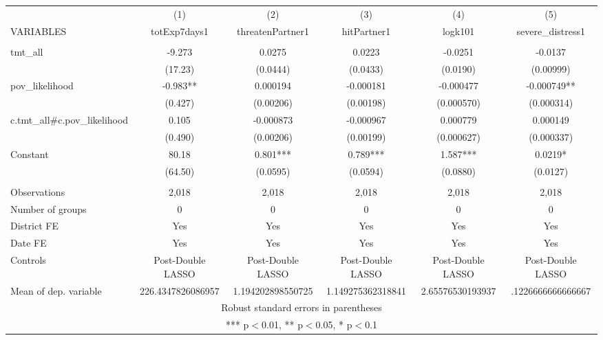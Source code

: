 \documentclass[]{article}
\begin{document}
\begin{tabular}{lccccc} \hline
 & (1) & (2) & (3) & (4) & (5) \\
VARIABLES & totExp7days1 & threatenPartner1 & hitPartner1 & logk101 & severe\_distress1 \\ \hline
 &  &  &  &  &  \\
tmt\_all & -9.273 & 0.0275 & 0.0223 & -0.0251 & -0.0137 \\
 & (17.23) & (0.0444) & (0.0433) & (0.0190) & (0.00999) \\
pov\_likelihood & -0.983** & 0.000194 & -0.000181 & -0.000477 & -0.000749** \\
 & (0.427) & (0.00206) & (0.00198) & (0.000570) & (0.000314) \\
c.tmt\_all\#c.pov\_likelihood & 0.105 & -0.000873 & -0.000967 & 0.000779 & 0.000149 \\
 & (0.490) & (0.00206) & (0.00199) & (0.000627) & (0.000337) \\
Constant & 80.18 & 0.801*** & 0.789*** & 1.587*** & 0.0219* \\
 & (64.50) & (0.0595) & (0.0594) & (0.0880) & (0.0127) \\
 &  &  &  &  &  \\
Observations & 2,018 & 2,018 & 2,018 & 2,018 & 2,018 \\
Number of groups & 0 & 0 & 0 & 0 & 0 \\
District FE & Yes & Yes & Yes & Yes & Yes \\
Date FE & Yes & Yes & Yes & Yes & Yes \\
Controls & Post-Double LASSO & Post-Double LASSO & Post-Double LASSO & Post-Double LASSO & Post-Double LASSO \\
 Mean of dep. variable & 226.4347826086957 & 1.194202898550725 & 1.149275362318841 & 2.65576530193937 & .1226666666666667 \\ \hline
\multicolumn{6}{c}{ Robust standard errors in parentheses} \\
\multicolumn{6}{c}{ *** p$<$0.01, ** p$<$0.05, * p$<$0.1} \\
\end{tabular}
\end{document}
